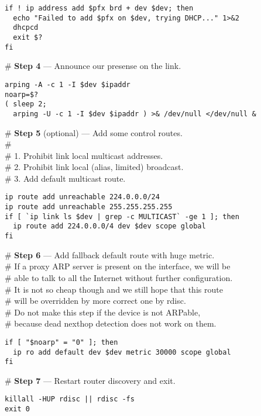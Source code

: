 \begin{verbatim}
if ! ip address add $pfx brd + dev $dev; then
  echo "Failed to add $pfx on $dev, trying DHCP..." 1>&2
  dhcpcd
  exit $?
fi
\end{verbatim}

\noindent\# {\bf Step 4} --- Announce our presense on the link.
\begin{verbatim}
arping -A -c 1 -I $dev $ipaddr
noarp=$?
( sleep 2;
  arping -U -c 1 -I $dev $ipaddr ) >& /dev/null </dev/null &
\end{verbatim}

\begin{flushleft}
\# {\bf Step 5} (optional) --- Add some control routes.\\
\#\\
\# 1. Prohibit link local multicast addresses.\\
\# 2. Prohibit link local (alias, limited) broadcast.\\
\# 3. Add default multicast route.
\end{flushleft}
\begin{verbatim}
ip route add unreachable 224.0.0.0/24 
ip route add unreachable 255.255.255.255
if [ `ip link ls $dev | grep -c MULTICAST` -ge 1 ]; then
  ip route add 224.0.0.0/4 dev $dev scope global
fi
\end{verbatim}

\begin{flushleft}
\# {\bf Step 6} --- Add fallback default route with huge metric.\\
\# If a proxy ARP server is present on the interface, we will be\\
\# able to talk to all the Internet without further configuration.\\
\# It is not so cheap though and we still hope that this route\\
\# will be overridden by more correct one by rdisc.\\
\# Do not make this step if the device is not ARPable,\\
\# because dead nexthop detection does not work on them.
\end{flushleft}
\begin{verbatim}
if [ "$noarp" = "0" ]; then
  ip ro add default dev $dev metric 30000 scope global
fi
\end{verbatim}

\begin{flushleft}
\# {\bf Step 7} --- Restart router discovery and exit.
\end{flushleft}
\begin{verbatim}
killall -HUP rdisc || rdisc -fs
exit 0
\end{verbatim}


